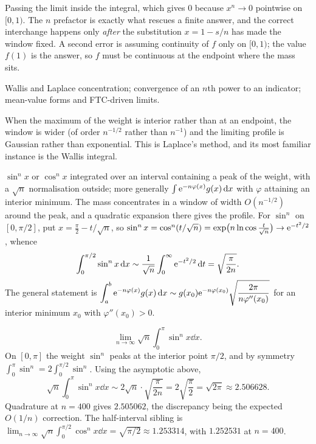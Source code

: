 \begin{trap}
Passing the limit inside the integral, which gives $0$ because $x^{n}\to0$ pointwise on $[0,1)$. The $n$ prefactor is exactly what rescues a finite answer, and the correct interchange happens only \emph{after} the substitution $x=1-s/n$ has made the window fixed. A second error is assuming continuity of $f$ only on $[0,1)$; the value $f(1)$ is the answer, so $f$ must be continuous at the endpoint where the mass sits.
\end{trap}

\begin{seealsob}Wallis and Laplace concentration; convergence of an $n$th power to an indicator; mean-value forms and FTC-driven limits.\end{seealsob}

When the maximum of the weight is interior rather than at an endpoint, the window is wider (of order $n^{-1/2}$ rather than $n^{-1}$) and the limiting profile is Gaussian rather than exponential. This is Laplace's method, and its most familiar instance is the Wallis integral.

\cue $\sin^{n}x$ or $\cos^{n}x$ integrated over an interval containing a peak of the weight, with a $\sqrt{n}$ normalisation outside; more generally $\int \mathrm{e}^{-n\varphi(x)}g(x)\,\mathrm{d} x$ with $\varphi$ attaining an interior minimum.
\method The mass concentrates in a window of width $O(n^{-1/2})$ around the peak, and a quadratic expansion there gives the profile. For $\sin^{n}$ on $[0,\pi/2]$, put $x=\tfrac\pi2-t/\sqrt n$, so $\sin^{n}x=\cos^{n}(t/\sqrt n)=\exp\bigl(n\ln\cos\tfrac{t}{\sqrt n}\bigr)\to \mathrm{e}^{-t^{2}/2}$, whence
\[\int_{0}^{\pi/2}\sin^{n}x\,\mathrm{d} x\sim\frac{1}{\sqrt n}\int_{0}^{\infty}\mathrm{e}^{-t^{2}/2}\,\mathrm{d} t=\sqrt{\frac{\pi}{2n}} .\]
The general statement is $\displaystyle\int_{a}^{b}\mathrm{e}^{-n\varphi(x)}g(x)\,\mathrm{d} x\sim g(x_{0})\mathrm{e}^{-n\varphi(x_{0})}\sqrt{\dfrac{2\pi}{n\varphi''(x_{0})}}$ for an interior minimum $x_{0}$ with $\varphi''(x_{0})>0$.

\begin{worked}
\[\lim_{n\to\infty}\sqrt{n}\int_{0}^{\pi}\sin^{n}x\dd x .\]
On $[0,\pi]$ the weight $\sin^{n}$ peaks at the interior point $\pi/2$, and by symmetry $\int_{0}^{\pi}\sin^{n}=2\int_{0}^{\pi/2}\sin^{n}$. Using the asymptotic above,
\[\sqrt n\int_{0}^{\pi}\sin^{n}x\dd x\sim 2\sqrt{n}\cdot\sqrt{\frac{\pi}{2n}}=2\sqrt{\frac\pi2}=\sqrt{2\pi}\approx2.506628 .\]
Quadrature at $n=400$ gives $2.505062$, the discrepancy being the expected $O(1/n)$ correction. The half-interval sibling is $\displaystyle\lim_{n\to\infty}\sqrt n\int_{0}^{\pi/2}\cos^{n}x\dd x=\sqrt{\pi/2}\approx1.253314$, with $1.252531$ at $n=400$.
\end{worked}

